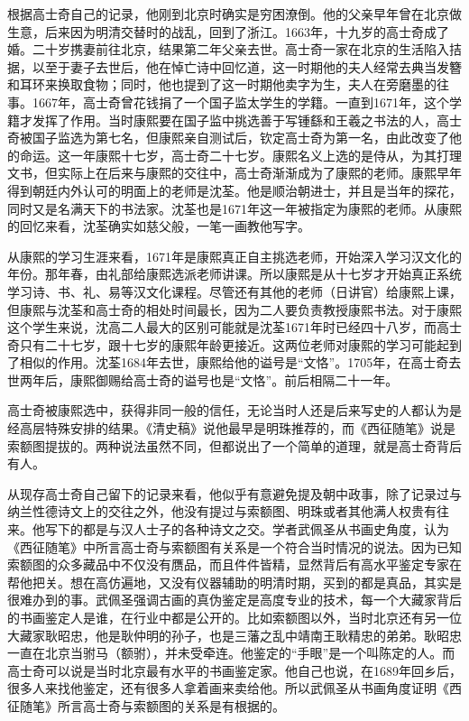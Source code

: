 
根据高士奇自己的记录，他刚到北京时确实是穷困潦倒。他的父亲早年曾在北京做生意，后来因为明清交替时的战乱，回到了浙江。1663年，十九岁的高士奇成了婚。二十岁携妻前往北京，结果第二年父亲去世。高士奇一家在北京的生活陷入拮据，以至于妻子去世后，他在悼亡诗中回忆道，这一时期他的夫人经常去典当发簪和耳环来换取食物；同时，他也提到了这一时期他卖字为生，夫人在旁磨墨的往事。1667年，高士奇曾花钱捐了一个国子监太学生的学籍。一直到1671年，这个学籍才发挥了作用。当时康熙要在国子监中挑选善于写锺繇和王羲之书法的人，高士奇被国子监选为第七名，但康熙亲自测试后，钦定高士奇为第一名，由此改变了他的命运。这一年康熙十七岁，高士奇二十七岁。康熙名义上选的是侍从，为其打理文书，但实际上在后来与康熙的交往中，高士奇渐渐成为了康熙的老师。康熙早年得到朝廷内外认可的明面上的老师是沈荃。他是顺治朝进士，并且是当年的探花，同时又是名满天下的书法家。沈荃也是1671年这一年被指定为康熙的老师。从康熙的回忆来看，沈荃确实如慈父般，一笔一画教他写字。



从康熙的学习生涯来看，1671年是康熙真正自主挑选老师，开始深入学习汉文化的年份。那年春，由礼部给康熙选派老师讲课。所以康熙是从十七岁才开始真正系统学习诗、书、礼、易等汉文化课程。尽管还有其他的老师（日讲官）给康熙上课，但康熙与沈荃和高士奇的相处时间最长，因为二人要负责教授康熙书法。对于康熙这个学生来说，沈高二人最大的区别可能就是沈荃1671年时已经四十八岁，而高士奇只有二十七岁，跟十七岁的康熙年龄更接近。这两位老师对康熙的学习可能起到了相似的作用。沈荃1684年去世，康熙给他的谥号是“文恪”。1705年，在高士奇去世两年后，康熙御赐给高士奇的谥号也是“文恪”。前后相隔二十一年。



高士奇被康熙选中，获得非同一般的信任，无论当时人还是后来写史的人都认为是经高层特殊安排的结果。《清史稿》说他最早是明珠推荐的，而《西征随笔》说是索额图提拔的。两种说法虽然不同，但都说出了一个简单的道理，就是高士奇背后有人。



从现存高士奇自己留下的记录来看，他似乎有意避免提及朝中政事，除了记录过与纳兰性德诗文上的交往之外，他没有提过与索额图、明珠或者其他满人权贵有往来。他写下的都是与汉人士子的各种诗文之交。学者武佩圣从书画史角度，认为《西征随笔》中所言高士奇与索额图有关系是一个符合当时情况的说法。因为已知索额图的众多藏品中不仅没有赝品，而且件件皆精，显然背后有高水平鉴定专家在帮他把关。想在高仿遍地，又没有仪器辅助的明清时期，买到的都是真品，其实是很难办到的事。武佩圣强调古画的真伪鉴定是高度专业的技术，每一个大藏家背后的书画鉴定人是谁，在行业中都是公开的。比如索额图以外，当时北京还有另一位大藏家耿昭忠，他是耿仲明的孙子，也是三藩之乱中靖南王耿精忠的弟弟。耿昭忠一直在北京当驸马（额驸），并未受牵连。他鉴定的“手眼”是一个叫陈定的人。而高士奇可以说是当时北京最有水平的书画鉴定家。他自己也说，在1689年回乡后，很多人来找他鉴定，还有很多人拿着画来卖给他。所以武佩圣从书画角度证明《西征随笔》所言高士奇与索额图的关系是有根据的。


